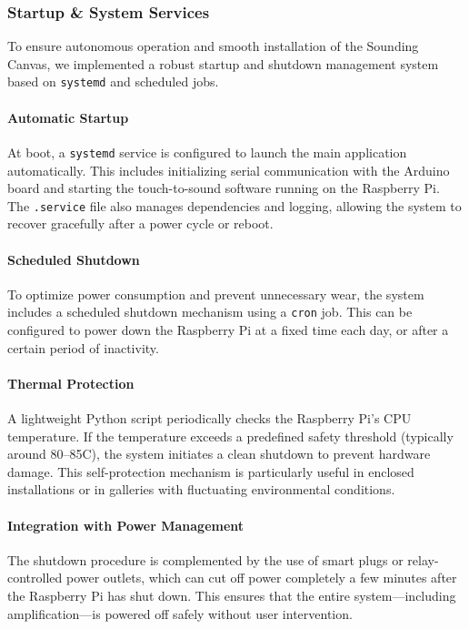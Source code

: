 \documentclass{article}
\begin{document}
\subsubsection{Startup \& System Services}
To ensure autonomous operation and smooth installation of the Sounding Canvas, we implemented a robust startup and shutdown management system based on \texttt{systemd} and scheduled jobs.

\paragraph{Automatic Startup}
At boot, a \texttt{systemd} service is configured to launch the main application automatically. This includes initializing serial communication with the Arduino board and starting the touch-to-sound software running on the Raspberry Pi. The \texttt{.service} file also manages dependencies and logging, allowing the system to recover gracefully after a power cycle or reboot.

\paragraph{Scheduled Shutdown}
To optimize power consumption and prevent unnecessary wear, the system includes a scheduled shutdown mechanism using a \texttt{cron} job. This can be configured to power down the Raspberry Pi at a fixed time each day, or after a certain period of inactivity.

\paragraph{Thermal Protection}
A lightweight Python script periodically checks the Raspberry Pi’s CPU temperature. If the temperature exceeds a predefined safety threshold (typically around 80–85\textdegree C), the system initiates a clean shutdown to prevent hardware damage. This self-protection mechanism is particularly useful in enclosed installations or in galleries with fluctuating environmental conditions.

\paragraph{Integration with Power Management}
The shutdown procedure is complemented by the use of smart plugs or relay-controlled power outlets, which can cut off power completely a few minutes after the Raspberry Pi has shut down. This ensures that the entire system—including amplification—is powered off safely without user intervention.
\end{document}
